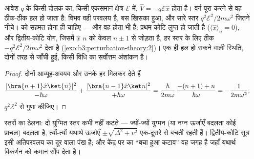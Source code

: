 \begin{proposition}[एक ऐसा विक्षोभ जिसका यथार्थ उत्तर है]\label{prop:b3:perturbation-theory:oscillator-field}
आवेश $q$ के किसी दोलक का, किसी एकसमान क्षेत्र $\mathcal E$ में,
$\hat V = -q\mathcal E\hat x$ होता है। वर्ग पूरा करने से वह ठीक-ठीक हल
हो जाता है: विभव वही परवलय है, बस खिसका हुआ, और सारे
स्तर $q^2\mathcal E^2/2m\omega^2$ जितने नीचे।  को
सहमत होना ही चाहिए --- और वह होता भी है: प्रथम कोटि लुप्त हो जाती है ($\langle\hat
x\rangle_n = 0$), और द्वितीय-कोटि योग, जिसमें $\hat x$
$n$ को केवल $n \pm 1$ से जोड़ता है, हर स्तर के लिए ठीक
$-q^2\mathcal E^2/2m\omega^2$ देता है
(\cref{exo:b3:perturbation-theory:2})। एक ही हल हो सकने वाली स्थिति,
दोनों तरह से जाँची हुई, किसी विधि का सर्वोत्तम अंशांकन है।
\end{proposition}

\begin{proof}
दोनों आव्यूह-अवयव और उनके हर मिलकर देते हैं
\[
\frac{|\bra{n+1}\hat x\ket{n}|^2}{-\hbar\omega}
 + \frac{|\bra{n-1}\hat x\ket n|^2}{+\hbar\omega}
 = \frac{\hbar}{2m\omega}\,\frac{-(n+1) + n}{\hbar\omega}
 = -\frac{1}{2m\omega^2} ;
\]
$q^2\mathcal E^2$ से गुणा कीजिए।
\end{proof}

\begin{omfigure}

{\small स्तरों का ठेलना: दो युग्मित स्तर कभी नहीं कटते --- ज्यों-ज्यों
युग्मन (या नग्न ऊर्जाएँ बदलता कोई प्राचल) बदलता है, त्यों-त्यों
यथार्थ ऊर्जाएँ $\pm\sqrt{\Delta^2 + v^2}$ एक-दूसरे से बचती रहती हैं।
द्वितीय-कोटि सूत्र इसी अतिपरवलय का दूर वाला पंख है; और
केंद्र पर का ``बचा हुआ कटाव'' वह जगह है जहाँ 
यथार्थ विकर्णन को कमान सौंप देता है।}
\end{omfigure}


